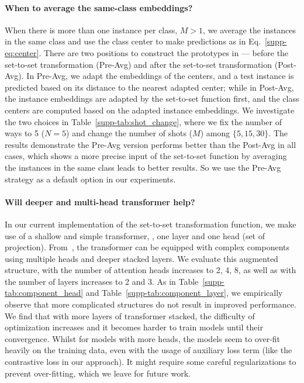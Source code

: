 \paragraph{When to average the same-class embeddings?}When there is more than one instance per class, \ie $M > 1$, we average the instances in the same class and use the class center to make predictions as in Eq.~\ref{supp-eq:center}. There are two positions to construct the prototypes in {\feat} --- before the set-to-set transformation (Pre-Avg) and after the set-to-set transformation (Post-Avg). In Pre-Avg, we adapt the embeddings of the centers, and a test instance is predicted based on its distance to the nearest adapted center; while in Post-Avg, the instance embeddings are adapted by the set-to-set function first, and the class centers are computed based on the adapted instance embeddings. We investigate the two choices in Table~\ref{supp-tab:shot_change}, where we fix the number of ways to 5 ($N=5$) and change the number of shots ($M$) among $\{5,15,30\}$. The results demonstrate the Pre-Avg version performs better than the Post-Avg in all cases, which shows a more precise input of the set-to-set function by averaging the instances in the same class leads to better results. So we use the Pre-Avg strategy as a default option in our experiments.

\paragraph{Will deeper and multi-head transformer help?} In our current implementation of the set-to-set transformation function, we make use of a shallow and simple transformer, \ie, one layer and one head (set of projection). From~\cite{VaswaniNIPS17Attention}, the transformer can be equipped with complex components using multiple heads and deeper stacked layers. We evaluate this augmented structure, with the number of attention heads increases to 2, 4, 8, as well as with the number of layers increases to 2 and 3. As in Table~\ref{supp-tab:component_head} and Table~\ref{supp-tab:component_layer}, we empirically observe that more complicated structures do not result in improved performance. We find that with more layers of transformer stacked, the difficulty of optimization increases and it becomes harder to train models until their convergence. Whilst for models with more heads, the models seem to over-fit heavily on the training data, even with the usage of auxiliary loss term (like the contrastive loss in our approach). It might require some careful regularizations to prevent over-fitting, which we leave for future work.

